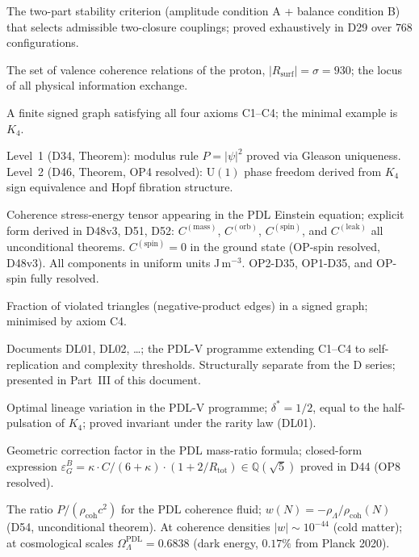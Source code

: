 \documentclass[11pt,a4paper]{article}
\theoremstyle{plain}
\theoremstyle{definition}
\theoremstyle{remark}
\newcommand{\Rsurf}{R_{\mathrm{surf}}}
\newcommand{\Rtot}{R_{\mathrm{tot}}}
\newcommand{\epsGeomB}{\varepsilon_G^B}
\newcommand{\rhocoh}{\rho_{\mathrm{coh}}}
\newcommand{\Ccoh}{C_{\mathrm{coh}}}
\begin{document}
\begin{description}[leftmargin=3.5cm, style=nextline]
\item[AB criterion] The two-part stability criterion (amplitude condition A + balance condition B) that selects admissible two-closure couplings; proved exhaustively in D29 over $768$ configurations.
\item[Active surface $\Rsurf$] The set of valence coherence relations of the proton, $|\Rsurf|=\sigma=930$; the locus of all physical information exchange.
\item[Admissible closure] A finite signed graph satisfying all four axioms C1--C4; the minimal example is $K_4$.
\item[Born Level~1 / Level~2] Level~1 (D34, Theorem): modulus rule $P=|\psi|^2$ proved via Gleason uniqueness. Level~2 (D46, Theorem, OP4 resolved): $\mathrm{U}(1)$ phase freedom derived from $K_4$ sign equivalence and Hopf fibration structure.
\item[$\Ccoh$] Coherence stress-energy tensor appearing in the PDL Einstein equation; explicit form derived in D48v3, D51, D52: $C^{(\mathrm{mass})}$, $C^{(\mathrm{orb})}$, $C^{(\mathrm{spin})}$, and $C^{(\mathrm{leak})}$ all unconditional theorems. $C^{(\mathrm{spin})}=0$ in the ground state (OP-spin resolved, D48v3). All components in uniform units J\,m$^{-3}$. OP2-D35, OP1-D35, and OP-spin fully resolved.
\item[Coherence cost] Fraction of violated triangles (negative-product edges) in a signed graph; minimised by axiom C4.
\item[DL series] Documents DL01, DL02, \ldots; the PDL-V programme extending C1--C4 to self-replication and complexity thresholds. Structurally separate from the D series; presented in Part~III of this document.
\item[$\delta^*$] Optimal lineage variation in the PDL-V programme; $\delta^* = 1/2$, equal to the half-pulsation of $K_4$; proved invariant under the rarity law (DL01).
\item[$\epsGeomB$] Geometric correction factor in the PDL mass-ratio formula; closed-form expression $\epsGeomB = \kappa \cdot C/(6+\kappa)\cdot(1+2/\Rtot) \in \mathbb{Q}(\sqrt{5})$ proved in D44 (OP8 resolved).
\item[Equation of state $w(N)$] The ratio $P/(\rhocoh c^2)$ for the PDL coherence fluid; $w(N) = -\rho_\Lambda/\rhocoh(N)$ (D54, unconditional theorem). At coherence densities $|w| \sim 10^{-44}$ (cold matter); at cosmological scales $\Omega_\Lambda^{\mathrm{PDL}} = 0.6838$ (dark energy, $0.17\%$ from Planck 2020).

\end{description}
\end{document}
